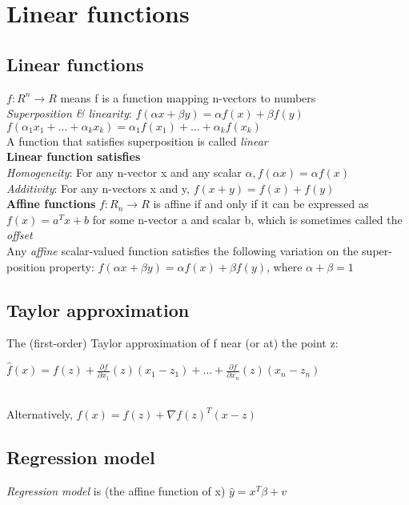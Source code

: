 \section{Linear functions}
\subsection{Linear functions} 
$f : R^n \to R$ means f is a function mapping n-vectors to numbers\\
\textit{Superposition \& linearity}: 
$f(\alpha x + \beta y) = \alpha f(x) + \beta f(y)$\\
\textbullet $ f(\alpha_1 x_1 +...+ \alpha_k x_k) = \alpha_1 f(x_1)+...+ \alpha_k f(x_k)$\\
A function that satisfies superposition is called \textit{linear}\\
\textbf{Linear function satisfies}\\
\textbullet \textit{Homogeneity}: For any n-vector x and any scalar $\alpha, f(\alpha x) = \alpha f(x)$ \\
\textbullet \textit{Additivity}: For any n-vectors x and y, $f(x + y) = f(x) + f(y)$\\
\textbf{Affine functions}
$f:R_n \to R$ is affine if and only if it can be expressed as $f(x) = a^Tx + b$ for some n-vector a and scalar b, which is sometimes called the \textit{offset}\\
\textbullet Any \textit{affine} scalar-valued function satisfies the following variation on the super-position property:
$f(\alpha x + \beta y) = \alpha f(x) + \beta f(y)$, where $\alpha + \beta = 1$

\subsection{Taylor approximation}
The (first-order) Taylor approximation of f near (or at) the point z:\\
\begin{scriptsize}
$\hat{f}(x)= f(z) + \frac{\partial f}{\partial x_1}(z)(x_1 - z_1) + ... +  \frac{\partial f}{\partial x_n}(z)(x_n - z_n)$
\end{scriptsize}\\
Alternatively,
$\hat{f}(x)=f(z)+ \nabla f(z)^T(x-z)$
\subsection{Regression model}
\textit{Regression model} is (the affine function of x) $\hat{y} = x^T \beta + v$
